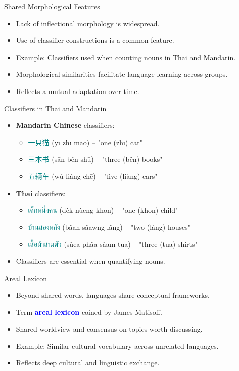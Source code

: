 \documentclass{beamer}
\newcommand{\mtplain}[1]{\textcolor{teal}{#1}}
\newcommand{\tha}[1]{\mtplain{\textthai{#1}}}
\newcommand{\zh}[1]{\mtplain{#1}}
\newcommand{\txx}[1]{\textcolor{blue}{\textbf{#1}}}
\begin{document}
\begin{frame}{Shared Morphological Features}
    \begin{itemize}
        \item Lack of inflectional morphology is widespread.
        \item Use of classifier constructions is a common feature.
        \item Example: Classifiers used when counting nouns in Thai and Mandarin.
        \item Morphological similarities facilitate language learning across groups.
        \item Reflects a mutual adaptation over time.
    \end{itemize}
\end{frame}
\begin{frame}{Classifiers in Thai and Mandarin}
    \begin{itemize}
        \item \textbf{Mandarin Chinese} classifiers:
            \begin{itemize}
                \item \zh{一只猫} (yī zhī māo) – "one (zhī) cat"
                \item \zh{三本书} (sān běn shū) – "three (běn) books"
                \item \zh{五辆车} (wǔ liàng chē) – "five (liàng) cars"
            \end{itemize}
        \item \textbf{Thai} classifiers:
            \begin{itemize}
                \item \tha{เด็กหนึ่งคน} (dèk nùeng khon) – "one (khon) child"
                \item \tha{บ้านสองหลัง} (bâan sǎawng lǎng) – "two (lǎng) houses"
                \item \tha{เสื้อผ้าสามตัว} (sûea phâa sǎam tua) – "three (tua) shirts"
            \end{itemize}
        \item Classifiers are essential when quantifying nouns.
    \end{itemize}
  \end{frame}
  
\begin{frame}{Areal Lexicon}
    \begin{itemize}
        \item Beyond shared words, languages share conceptual frameworks.
        \item Term \txx{areal lexicon} coined by James Matisoff.
        \item Shared worldview and consensus on topics worth discussing.
        \item Example: Similar cultural vocabulary across unrelated languages.
        \item Reflects deep cultural and linguistic exchange.
    \end{itemize}
\end{frame}
\end{document}
